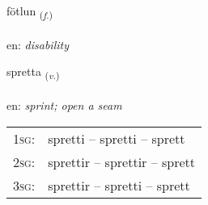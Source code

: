\documentclass[frontgrid, backgrid]{flacards}\usepackage[]{graphicx}\usepackage[]{xcolor}
\begin{document}
\renewcommand{\flhead}{\vskip5pt \fboxsep=0pt {\small\bfseries\footnotesize Nafnorð | Noun}}
\renewcommand{\fcfoot}{\vskip5pt \fboxsep=0pt \hspace{2pt}{\small\bfseries\footnotesize 3K}}

\renewcommand{\blhead}{\vskip5pt {\small\bfseries\footnotesize Nafnorð | Noun }}
\renewcommand{\bcfoot}{\vskip5pt \hspace{2pt}{\small\bfseries\footnotesize 3K}}


{fötlun \small{\textsubscript{(\textit{f.})}} \\[1ex] %
\textphonetic{[fœhtlʏn]} \\
en: \emph{disability} \\  [2ex]
\renewcommand*{\arraystretch}{0.8}
}

\renewcommand{\flhead}{\vskip5pt \fboxsep=0pt {\small\bfseries\footnotesize Sagnorð | Verb}}
\renewcommand{\fcfoot}{\vskip5pt \fboxsep=0pt \hspace{2pt}{\small\bfseries\footnotesize 3K}}

\renewcommand{\blhead}{\vskip5pt {\small\bfseries\footnotesize Sagnorð | Verb }}
\renewcommand{\bcfoot}{\vskip5pt \hspace{2pt}{\small\bfseries\footnotesize 3K}}


{spretta \small{\textsubscript{(\textit{v.})}} \\[1ex] %
\textphonetic{[sprɛhta]} \\
en: \emph{sprint; open a seam} \\  [2ex]
\renewcommand*{\arraystretch}{0.8}
\begin{tabular}{p{1cm}l}
\textsc{1sg}: & spretti -- spretti -- sprett \\ 
\textsc{2sg}: & sprettir -- sprettir -- sprett \\ 
\textsc{3sg}: & sprettir -- spretti -- sprett \\ 
\end{tabular}
}
\end{document}
